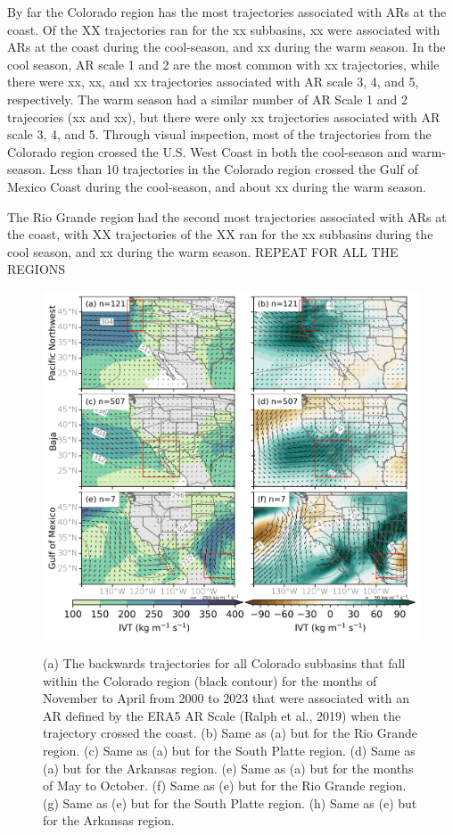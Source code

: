 \documentclass[draft]{agujournal2019}
\begin{document}
By far the Colorado region has the most trajectories associated with ARs at the coast. Of the XX trajectories ran for the xx subbasins, xx were associated with ARs at the coast during the cool-season, and xx during the warm season. In the cool season, AR scale 1 and 2 are the most common with xx trajectories, while there were xx, xx, and xx trajectories associated with AR scale 3, 4, and 5, respectively. The warm season had a similar number of AR Scale 1 and 2 trajecories (xx and xx), but there were only xx trajectories associated with AR scale 3, 4, and 5. Through visual inspection, most of the trajectories from the Colorado region crossed the U.S. West Coast in both the cool-season and warm-season. Less than 10 trajectories in the Colorado region crossed the Gulf of Mexico Coast during the cool-season, and about xx during the warm season. 

The Rio Grande region had the second most trajectories associated with ARs at the coast, with XX trajectories of the XX ran for the xx subbasins during the cool season, and xx during the warm season. REPEAT FOR ALL THE REGIONS

\begin{figure}
\includegraphics{fig5.png}
\label{fig:spaghetti_plot}
\caption{(a) The backwards trajectories for all Colorado subbasins that fall within the Colorado region (black contour) for the months of November to April from 2000 to 2023 that were associated with an AR defined by the ERA5 AR Scale (Ralph et al., 2019) when the trajectory crossed the coast. (b) Same as (a) but for the Rio Grande region. (c) Same as (a) but for the South Platte region. (d) Same as (a) but for the Arkansas region. (e) Same as (a) but for the months of May to October. (f) Same as (e) but for the Rio Grande region. (g) Same as (e) but for the South Platte region. (h) Same as (e) but for the Arkansas region.}
\end{figure}
\end{document}
